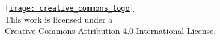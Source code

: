 %
%

\pubmode
	\onecolumngrid
\fi

\vspace*{180pt}
\begin{center}
	\href{http://creativecommons.org/licenses/by/4.0/}{\texttt{[image: creative\_commons\_logo]}}\\
	This work is licensed under a\\ \href{http://creativecommons.org/licenses/by/4.0/}{Creative Commons Attribution 4.0 International License}.
\end{center}
\newpage

\pubmode
	\twocolumngrid
\fi